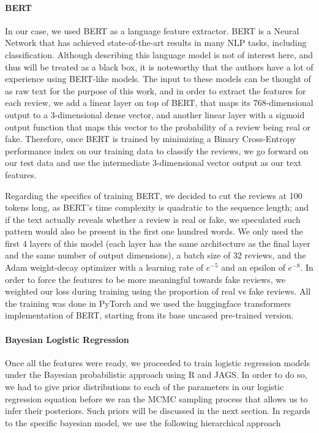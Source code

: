 \paragraph{BERT} In our case, we used BERT as a language feature extractor. BERT is a Neural Network that has achieved state-of-the-art results in many NLP tasks, including classification. Although describing this language model is not of interest here, and thus will be treated as a black box, it is noteworthy that the authors have a lot of experience using BERT-like models. The input to these models can be thought of as raw text for the purpose of this work, and in order to extract the features for each review, we add a linear layer on top of BERT, that maps its 768-dimensional output to a 3-dimensional dense vector, and another linear layer with a sigmoid output function that maps this vector to the probability of a review being real or fake. Therefore, once BERT is trained by minimizing a Binary Cross-Entropy performance index on our training data to classify the reviews, we go forward on our test data and use the intermediate 3-dimensional vector output as our text features. 

Regarding the specifics of training BERT, we decided to cut the reviews at 100 tokens long, as BERT's time complexity is quadratic to the sequence length; and if the text actually reveals whether a review is real or fake, we speculated such pattern would also be present in the first one hundred words. We only used the first 4 layers of this model (each layer has the same architecture as the final layer and the same number of output dimensions), a batch size of 32 reviews, and the Adam weight-decay optimizer with a learning rate of $e^{-5}$ and an epsilon of $e^{-8}$. In order to force the features to be more meaningful towards fake reviews, we weighted our loss during training using the proportion of real vs fake reviews. All the training was done in PyTorch and we used the huggingface transformers implementation of BERT, starting from its base uncased pre-trained version.

\vspace{2mm}

\paragraph{Bayesian Logistic Regression} Once all the features were ready, we proceeded to train logistic regression models under the Bayesian probabilistic approach using R and JAGS. In order to do so, we had to give prior distributions to each of the parameters in our logistic regression equation before we ran the MCMC sampling process that allows us to infer their posteriors. Such priors will be discussed in the next section. In regards to the specific bayesian model, we use the following hierarchical approach 


